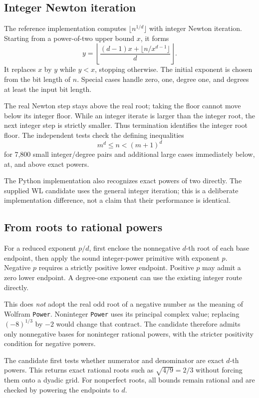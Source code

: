 \documentclass[11pt,a4paper]{article}
\newcommand{\code}[1]{\nolinkurl{#1}}
\begin{document}
\subsection{Integer Newton iteration}

The reference implementation computes $\lfloor n^{1/d}\rfloor$ with integer Newton iteration. Starting from a power-of-two upper bound $x$, it forms
\[
y=\left\lfloor\frac{(d-1)x+\lfloor n/x^{d-1}\rfloor}{d}\right\rfloor.
\]
It replaces $x$ by $y$ while $y<x$, stopping otherwise. The initial exponent is chosen from the bit length of $n$. Special cases handle zero, one, degree one, and degrees at least the input bit length.

The real Newton step stays above the real root; taking the floor cannot move below its integer floor. While an integer iterate is larger than the integer root, the next integer step is strictly smaller. Thus termination identifies the integer root floor. The independent tests check the defining inequalities
\[
m^d\le n<(m+1)^d
\]
for 7,800 small integer/degree pairs and additional large cases immediately below, at, and above exact powers.

The Python implementation also recognizes exact powers of two directly. The supplied WL candidate uses the general integer iteration; this is a deliberate implementation difference, not a claim that their performance is identical.

\subsection{From roots to rational powers}

For a reduced exponent $p/d$, first enclose the nonnegative $d$-th root of each base endpoint, then apply the sound integer-power primitive with exponent $p$. Negative $p$ requires a strictly positive lower endpoint. Positive $p$ may admit a zero lower endpoint. A degree-one exponent can use the existing integer route directly.

This does \emph{not} adopt the real odd root of a negative number as the meaning of Wolfram \code{Power}. Noninteger \code{Power} uses its principal complex value; replacing $(-8)^{1/3}$ by $-2$ would change that contract. The candidate therefore admits only nonnegative bases for noninteger rational powers, with the stricter positivity condition for negative powers.\cite{power}

The candidate first tests whether numerator and denominator are exact $d$-th powers. This returns exact rational roots such as $\sqrt{4/9}=2/3$ without forcing them onto a dyadic grid. For nonperfect roots, all bounds remain rational and are checked by powering the endpoints to $d$.
\end{document}

